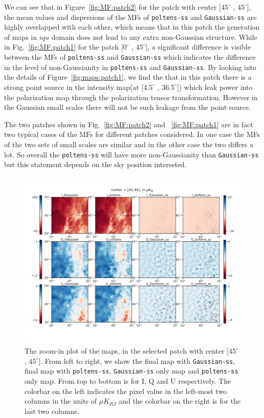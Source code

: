 \documentclass[twocolumn]{aastex631}
\begin{document}
We can see that in Figure~\ref{fig:MF:patch2} for the patch with center [$45^{\circ}$ , $45^{\circ} $], the mean values and dispersions of the MFs of \texttt{poltens-ss} and \texttt{Gaussian-ss} are highly overlapped with each other, which means that in this patch the generation of maps in $iqu$ domain does not lead to any extra non-Gaussian structure. While in Fig.~\ref{fig:MF:patch1} for the patch [$0^{\circ}$ , $45^{\circ} $], a significant difference is visible between the MFs of \texttt{poltens-ss} and \texttt{Gaussian-ss} which indicates the difference in the level of non-Gaussianity in \texttt{poltens-ss} and \texttt{Gaussian-ss}. By looking into the details of Figure~\ref{fig:maps:patch1}, we find the that in this patch there is a strong point source in the intensity map(at [$4.5^{\circ}$ , $36.5^{\circ} $]) which leak power into the polarization map through the polarization tensor transformation. However in the Gaussian small scales there will not be such leakage from the point source.  

The two patches shown in Fig.~\ref{fig:MF:patch2} and ~\ref{fig:MF:patch1} are in fact two typical cases of the MFs for different patches considered. In one case the MFs of the two sets of small scales are similar and in the other case the two differs a lot. So overall the \texttt{poltens-ss} will have more non-Gaussianity than \texttt{Gaussian-ss} but this statement depends on the sky position interested. 


\begin{figure}[hbt]
    \centering
    \includegraphics[width=180mm]{maps_patch2.pdf}
    \caption{The zoom-in plot of the maps, in the selected patch with center [$45^{\circ}$ , $45^{\circ} $]. From left to right, we show the final map with \texttt{Gaussian-ss}, final map with \texttt{poltens-ss}, \texttt{Gaussian-ss} only map and \texttt{poltens-ss} only map. From top to bottom is for I, Q and U respectively. The colorbar on the left indicates the pixel value in the left-most two columns in the units of $\mu K_{RJ}$ and the colorbar on the right is for the last two columns. }
    \label{fig:maps:patch2}
\end{figure}
\end{document}
